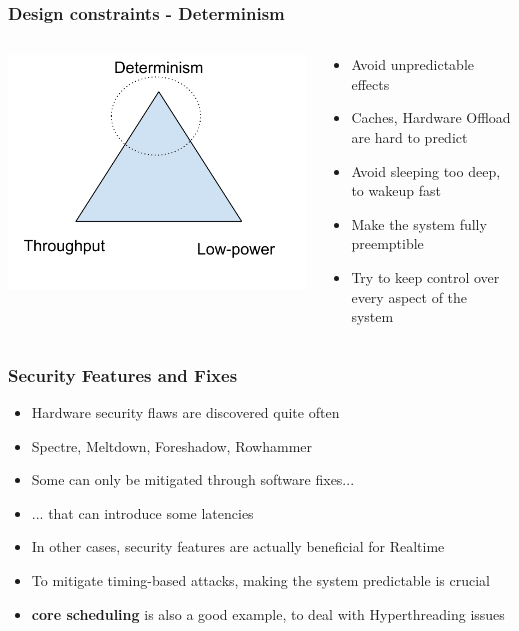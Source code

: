 \begin{frame}
	\frametitle{Design constraints - Determinism}
	\begin{columns}
	\begin{column}{0.35\textwidth}
	\includegraphics[width=\textwidth]{slides/realtime-linux-realtime-systems/triangle_design_determinism.pdf}
	\end{column}
		\begin{column}{0.65\textwidth}
			\begin{itemize}
				\item Avoid unpredictable effects
				\item Caches, Hardware Offload are hard to predict
				\item Avoid sleeping too deep, to wakeup fast
				\item Make the system fully preemptible
				\item Try to keep control over every aspect of the system
			\end{itemize}
		\end{column}
	\end{columns}
\end{frame}

\begin{frame}
	\frametitle{Security Features and Fixes}
	\begin{itemize}
		\item Hardware security flaws are discovered quite often
		\item Spectre, Meltdown, Foreshadow, Rowhammer
		\item Some can only be mitigated through software fixes...
		\item ... that can introduce some latencies
		\item In other cases, security features are actually beneficial for Realtime
		\item To mitigate timing-based attacks, making the system predictable is crucial
		\item \textbf{core scheduling} is also a good example, to deal with Hyperthreading issues
	\end{itemize}
\end{frame}

